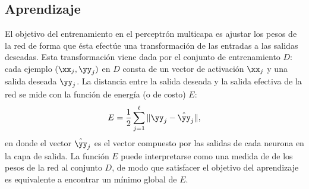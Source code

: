 %
%
\subsection{Aprendizaje}
%



El objetivo del entrenamiento en el perceptrón multicapa es ajustar
los pesos de la red de forma que ésta efectúe una transformación de
las entradas a las salidas deseadas. Esta transformación viene dada
por el conjunto de entrenamiento $D$: cada ejemplo $(\xx_j,\yy_j)$ en
$D$ consta de un vector de activación $\xx_j$ y una salida deseada
$\yy_j$.  La distancia entre la salida deseada y la salida efectiva de
la red se mide con la función de energía (o de costo) $E$:
%
\begin{align}\label{e2:energy-function}
  E = \frac{1}{2}\sum_{j=1}^{\ell}\|\yy_j-\hat{\yy}_j\|,
\end{align}
%
en donde el vector $\hat{\yy}_j$ es el vector compuesto por las
salidas de cada neurona en la capa de salida. La función $E$ puede
interpretarse como una medida de  de los pesos de la red al
conjunto $D$, de modo que satisfacer el objetivo del aprendizaje es
equivalente a encontrar un mínimo global de $E$.

